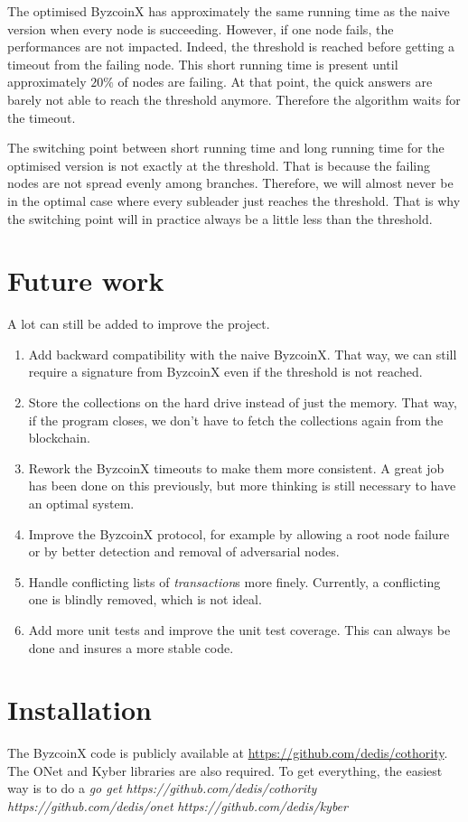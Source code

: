 \documentclass[11pt, a4paper, twoside, openright]{article}
\begin{document}
The optimised ByzcoinX has approximately the same running time as the naive version when every node is succeeding. However, if one node fails, the performances are not impacted. Indeed, the threshold is reached before getting a timeout from the failing node. This short running time is present until approximately $20\%$ of nodes are failing. At that point, the quick answers are barely not able to reach the threshold anymore. Therefore the algorithm waits for the timeout.

The switching point between short running time and long running time for the optimised version is not exactly at the threshold. That is because the failing nodes are not spread evenly among branches. Therefore, we will almost never be in the optimal case where every subleader just reaches the threshold. That is why the switching point will in practice always be a little less than the threshold.

\section{Future work}
\label{future_works}
A lot can still be added to improve the project.
\begin{enumerate}
\item Add backward compatibility with the naive ByzcoinX. That way, we can still require a signature from ByzcoinX even if the threshold is not reached.
\item Store the collections on the hard drive instead of just the memory. That way, if the program closes, we don't have to fetch the collections again from the blockchain.
\item Rework the ByzcoinX timeouts to make them more consistent. A great job has been done on this previously, but more thinking is still necessary to have an optimal system.
\item Improve the ByzcoinX protocol, for example by allowing a root node failure or by better detection and removal of adversarial nodes.
\item Handle conflicting lists of \textit{transaction}s more finely. Currently, a conflicting one is blindly removed, which is not ideal.
\item Add more unit tests and improve the unit test coverage. This can always be done and insures a more stable code.
\end{enumerate}

\section{Installation}
The ByzcoinX code is publicly available at \url{https://github.com/dedis/cothority}. The ONet and Kyber libraries are also required. To get everything, the easiest way is to do a \textit{go get} \textit{https://github.com/dedis/cothority}\\ \textit{https://github.com/dedis/onet} \textit{https://github.com/dedis/kyber}
\end{document}
